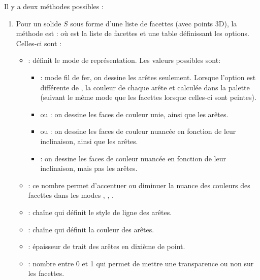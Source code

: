 Il y a deux méthodes possibles :
\begin{enumerate}
    \item Pour un solide $S$ sous forme d'une liste de facettes (avec points 3D), la méthode est :
    où  est la liste de facettes et  une table définissant les options. Celles-ci sont :
    \begin{itemize}
        \item {} : définit le mode de représentation. Les valeurs possibles sont:
            \begin{itemize}
                \item {} : mode fil de fer, on dessine les arêtes seulement. Lorsque l'option  est différente de \nil, la couleur de chaque arête et calculée dans la palette (suivant le même mode que les facettes lorsque celles-ci sont peintes).
                
                \item {} ou  : on dessine les faces de couleur unie, ainsi que les arêtes.
                
                \item {} ou  : on dessine les faces de couleur nuancée en fonction de leur inclinaison, ainsi que les arêtes.
                
                \item {} : on dessine les faces de couleur nuancée en fonction de leur inclinaison, mais pas les arêtes.
            \end{itemize}
        \item {} : ce nombre permet d'accentuer ou diminuer la nuance des couleurs des facettes dans les modes , , .
        
        \item {} : chaîne qui définit le style de ligne des arêtes.
        
        \item {} : chaîne qui définit la couleur des arêtes.
        
        \item {} : épaisseur de trait des arêtes en dixième de point.

        \item {} : nombre entre 0 et 1 qui permet de mettre une transparence ou non sur les facettes.
        

\end{itemize}
\end{enumerate}
